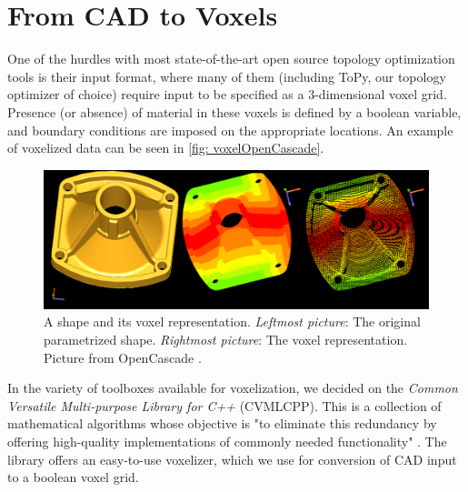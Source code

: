 \section{From \acs{CAD} to Voxels}
\label{sec: CADToVoxels}
One of the hurdles with most state-of-the-art open source topology optimization tools is their input format, where many of them (including ToPy, our topology optimizer of choice) require input to be specified as a 3-dimensional voxel grid. Presence (or absence) of material in these voxels is defined by a boolean variable, and boundary conditions are imposed on the appropriate locations. An example of voxelized data can be seen in \autoref{fig: voxelOpenCascade}. %
\begin{figure}
\centering
  \includegraphics[scale=0.3]{Pictures/CADToVoxel/voxels_wp_image005.png}
\caption{A shape and its voxel representation. \emph{Leftmost picture}: The original parametrized shape. \emph{Rightmost picture}: The voxel representation. Picture from OpenCascade \cite{OpenCascade}.}
\label{fig: voxelOpenCascade}
\end{figure}

\label{sec:CVMLCPP}
In the variety of toolboxes available for voxelization, we decided on the \emph{Common Versatile Multi-purpose Library for C++} (CVMLCPP). This is a collection of mathematical algorithms whose objective is "to eliminate this redundancy by offering high-quality implementations of commonly needed functionality" \cite{CVMLCPP}. The library offers an easy-to-use voxelizer, which we use for conversion of CAD input to a boolean voxel grid.

